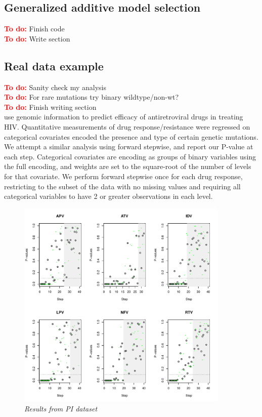 \documentclass{imsart}
\newcommand{\todo}{\textcolor{red}{\textbf{To do: }}}
\begin{document}
\subsection{Generalized additive model selection}
\todo Finish code \\
\todo Write section \\

\subsection{Real data example}
\label{sec:hiv}
\todo Sanity check my analysis \\
\todo For rare mutations try binary wildtype/non-wt? \\
\todo Finish writing section \\

\cite{HIV} use genomic information to predict efficacy of antiretroviral
drugs in treating HIV. Quantitative measurements of drug
response/resistance were regressed on categorical covariates encoded
the presence and type of certain genetic mutations. We attempt a similar
analysis using forward stepwise, and report our P-value at each step.
Categorical covariates are encoding as groups of binary variables using
the full encoding, and weights are set to the square-root of the
number of levels for that covariate. We perform forward stepwise once
for each drug response, restricting to the subset of the data with
no missing values and requiring all categorical variables to have 2 or
greater observations in each level. 

\begin{figure}
\begin{center}
\includegraphics[width=0.9\textwidth]{../figs/HIV_PI.pdf}
\caption{\small \it Results from PI dataset}
\label{fig:HIVPI}
\end{center}
\end{figure}
\end{document}
